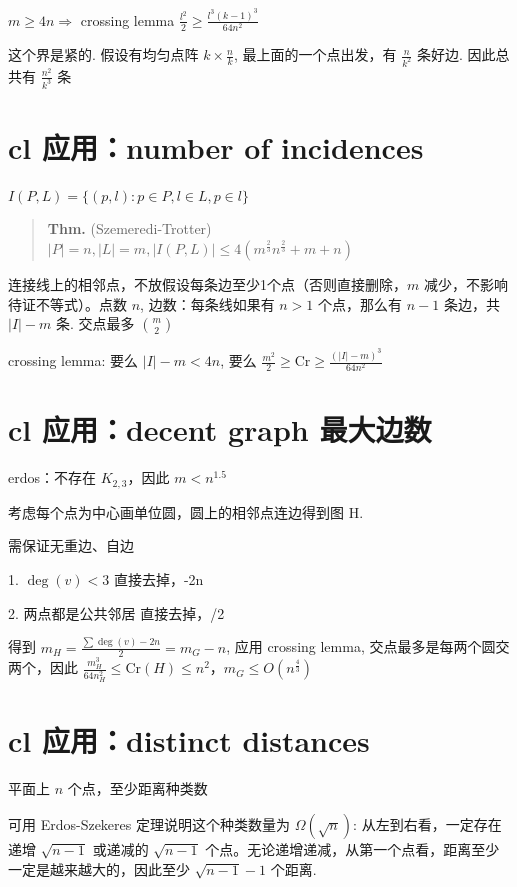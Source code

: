 $m\geq 4n\Rightarrow$ crossing lemma $\frac{l^2}{2}\geq\frac{l^3(k-1)^3}{64n^2}$

这个界是紧的. 假设有均匀点阵 $k\times\frac{n}{k}$, 最上面的一个点出发，有 $\frac{n}{k^2}$ 条好边. 因此总共有 $\frac{n^2}{k^3}$ 条

\section{cl 应用：number of incidences}

$I(P,L)=\{(p,l):p\in P,l\in L,p\in l\}$

\begin{quotation}
\textbf{Thm.} (Szemeredi-Trotter) $|P|=n,|L|=m,|I(P,L)|\leq 4(m^{\frac{2}{3}}n^{\frac{2}{3}}+m+n)$
\end{quotation}

连接线上的相邻点，不放假设每条边至少1个点（否则直接删除，$m$ 减少，不影响待证不等式）。点数 $n$, 边数：每条线如果有 $n>1$ 个点，那么有 $n-1$ 条边，共 $|I|-m$ 条. 交点最多 ${m\choose 2}$

crossing lemma: 要么 $|I|-m<4n$, 要么 $\frac{m^2}{2}\geq\text{Cr}\geq\frac{(|I|-m)^3}{64n^2}$

\section{cl 应用：decent graph 最大边数}

erdos：不存在 $K_{2,3}$，因此 $m<n^{1.5}$

考虑每个点为中心画单位圆，圆上的相邻点连边得到图 H.

需保证无重边、自边

1. $\deg(v)<3$ 直接去掉，-2n

2. 两点都是公共邻居 直接去掉，/2

得到 $m_H=\frac{\sum\deg(v)-2n}{2}=m_G-n$, 应用 crossing lemma, 交点最多是每两个圆交两个，因此 $\frac{m_H^3}{64n_H^2}\leq \text{Cr}(H)\leq n^2$，$m_G\leq O(n^{\frac{4}{3}})$

\section{cl 应用：distinct distances}

平面上 $n$ 个点，至少距离种类数


可用 Erdos-Szekeres 定理说明这个种类数量为 $\Omega(\sqrt{n})$: 从左到右看，一定存在递增 $\sqrt{n-1}$ 或递减的 $\sqrt{n-1}$ 个点。无论递增递减，从第一个点看，距离至少一定是越来越大的，因此至少 $\sqrt{n-1}-1$ 个距离.

